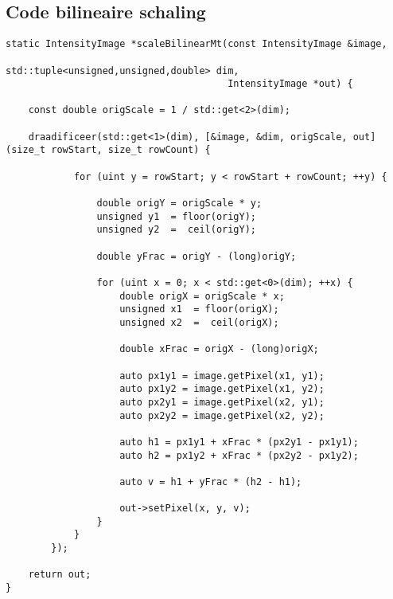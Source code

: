 \documentclass[a4paper]{article}
\begin{document}
\subsection{Code bilineaire schaling}
\label{sec:org5f2739a}
\begin{verbatim}
static IntensityImage *scaleBilinearMt(const IntensityImage &image,
                                       std::tuple<unsigned,unsigned,double> dim,
                                       IntensityImage *out) {

    const double origScale = 1 / std::get<2>(dim);

    draadificeer(std::get<1>(dim), [&image, &dim, origScale, out](size_t rowStart, size_t rowCount) {

            for (uint y = rowStart; y < rowStart + rowCount; ++y) {

                double origY = origScale * y;
                unsigned y1  = floor(origY);
                unsigned y2  =  ceil(origY);

                double yFrac = origY - (long)origY;

                for (uint x = 0; x < std::get<0>(dim); ++x) {
                    double origX = origScale * x;
                    unsigned x1  = floor(origX);
                    unsigned x2  =  ceil(origX);

                    double xFrac = origX - (long)origX;

                    auto px1y1 = image.getPixel(x1, y1);
                    auto px1y2 = image.getPixel(x1, y2);
                    auto px2y1 = image.getPixel(x2, y1);
                    auto px2y2 = image.getPixel(x2, y2);

                    auto h1 = px1y1 + xFrac * (px2y1 - px1y1);
                    auto h2 = px1y2 + xFrac * (px2y2 - px1y2);

                    auto v = h1 + yFrac * (h2 - h1);

                    out->setPixel(x, y, v);
                }
            }
        });

    return out;
}
\end{verbatim}
\end{document}
